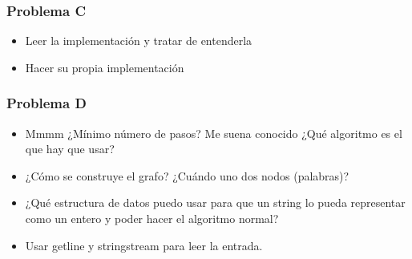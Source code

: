 \documentclass{beamer}
\begin{document}
	\begin{frame}
		\frametitle{Problema C}
		\begin{itemize}
			\item Leer la implementación y tratar de entenderla
			\item Hacer su propia implementación
		\end{itemize}
	\end{frame}
	
	\begin{frame}
		\frametitle{Problema D}
		\begin{itemize}
			\item Mmmm ¿Mínimo número de pasos? Me suena conocido ¿Qué algoritmo es el que hay que usar?
			\item ¿Cómo se construye el grafo? ¿Cuándo uno dos nodos (palabras)?
			\item ¿Qué estructura de datos puedo usar para que un string lo pueda representar como un entero y poder hacer el algoritmo normal?
			\item Usar getline y stringstream para leer la entrada.
		\end{itemize}
	\end{frame}
	
\end{document}
